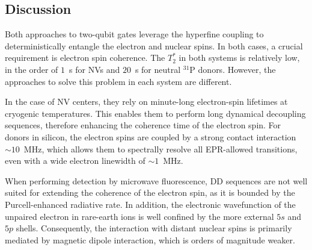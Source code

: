 

\subsection*{Discussion}

Both approaches to two-qubit gates leverage the hyperfine coupling to deterministically entangle the electron and nuclear spins. In both cases, a crucial requirement is electron spin coherence. The $T_2^*$ in both systems is relatively low, in the order of $1$~\textmu s for NVs and $20$~\textmu s for neutral $^{31}\mathrm{P}$ donors. However, the approaches to solve this problem in each system are different.

In the case of NV centers, they rely on minute-long electron-spin lifetimes at cryogenic temperatures. This enables them to perform long dynamical decoupling sequences, therefore enhancing the coherence time of the electron spin. For donors in silicon, the electron spins are coupled by a strong contact interaction $\sim10$~MHz, which allows them to spectrally resolve all EPR-allowed transitions, even with a wide electron linewidth of $\sim1$~MHz.

When performing detection by microwave fluorescence, DD sequences are not well suited for extending the coherence of the electron spin, as it is bounded by the Purcell-enhanced radiative rate. In addition, the electronic wavefunction of the unpaired electron in rare-earth ions is well confined by the more external $5s$ and $5p$ shells. Consequently, the interaction with distant nuclear spins is primarily mediated by magnetic dipole interaction, which is orders of magnitude weaker. 

